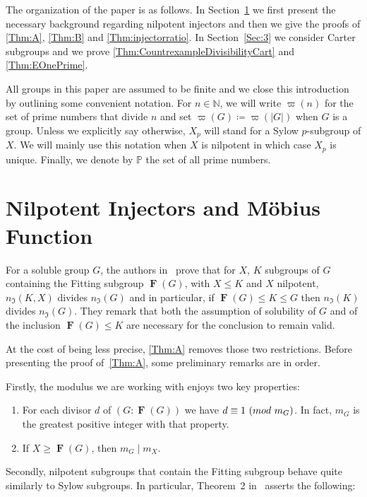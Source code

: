 \documentclass[10pt,a4paper]{amsart}
\numberwithin{equation}{section}
\DeclareMathOperator{\fitt}{\mathbf{F}}
\renewcommand{\leq}{\leqslant}
\renewcommand{\geq}{\geqslant}
\newcommand{\md}[1]{\,\left(\textnormal{mod}\ #1\right)}
\begin{document}
The organization of the paper is as follows. In Section~\ref{Sec:2} we first present the necessary background regarding nilpotent injectors and then we give the proofs of \autoref{Thm:A}, \autoref{Thm:B} and \autoref{Thm:injectorratio}. In Section~\ref{Sec:3} we consider Carter subgroups and we prove \autoref{Thm:CountrexampleDivisibilityCart} and \autoref{Thm:EOnePrime}.


All groups in this paper are assumed to be finite and we close this introduction by outlining some convenient notation.  For $n \in \mathbb{N}$, we will write $\varpi(n)$
for the set of prime numbers that divide $n$
and set $\varpi(G) \coloneqq \varpi(|G|)$ when $G$ is a group.
Unless we explicitly say otherwise, 
$X_p$ will stand for a Sylow $p$-subgroup of $X$. 
We will mainly use this notation when $X$ is nilpotent 
in which case $X_p$ is unique. Finally, we denote by $\mathbb{P}$ the set of all prime numbers.


\section{Nilpotent Injectors and M\"{o}bius Function}\label{Sec:2}

For a soluble group $G$, 
the authors in~\cite[Cor.~1.3]{arithmetical_questions} prove
that for $X$, $K$ subgroups of $G$
containing the Fitting subgroup $\fitt(G)$, with $X \leq K$ and $X$ nilpotent,
$n_\mathfrak{I}(K, X)$ divides $n_{\mathfrak{I}}(G)$
and in particular, if $\fitt(G) \leq K \leq G$ then
$n_{\mathfrak{I}}(K)$ divides $n_{\mathfrak{I}}(G)$.
They remark that both the assumption of solubility of $G$
and of the inclusion $\fitt(G) \leq K$ are necessary for
the conclusion to remain valid.

At the cost of being less precise,
\autoref{Thm:A} removes those two restrictions.
Before presenting the proof of~\autoref{Thm:A}, some preliminary remarks are in order.

Firstly, the modulus we are working with enjoys two key properties:
\begin{enumerate}[label={\upshape(\roman*)}]
\item\label{1} For each divisor $d$ of $(G : \fitt(G))$
we have $d \equiv 1 \md{m_G}$. 
In fact, $m_G$ is the greatest positive integer with that property.
\item\label{2} If $X \geq \fitt(G)$, then $m_G \mid m_X$.
\end{enumerate}

Secondly, nilpotent subgroups that contain the Fitting subgroup 
behave quite similarly to Sylow subgroups.
In particular, Theorem~2 in~\cite{mann_injectors} asserts the following:
\end{document}
